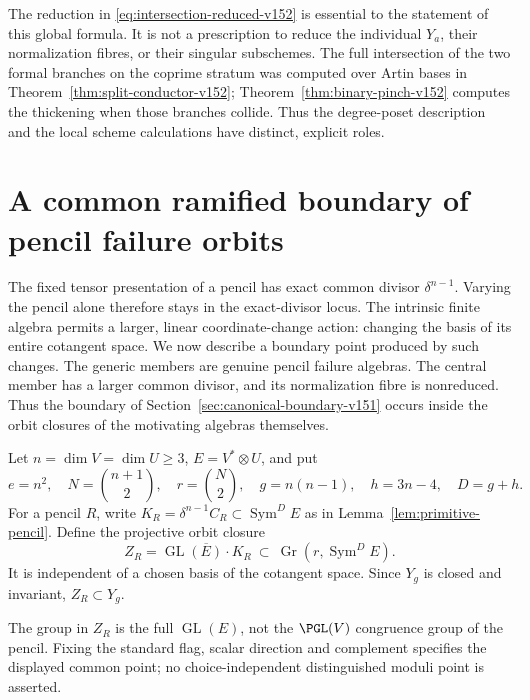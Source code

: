 \documentclass[11pt,reqno]{amsart}
\numberwithin{equation}{section}
\theoremstyle{definition}\newtheorem{definition}[theorem]{Definition}
\theoremstyle{remark}\newtheorem{remark}[theorem]{Remark}
\DeclareMathOperator{\Sym}{Sym}\DeclareMathOperator{\Gr}{Gr}
\begin{document}
The reduction in \eqref{eq:intersection-reduced-v152} is essential
to the statement of this global formula.  It is not a prescription
to reduce the individual $Y_a$, their normalization fibres, or their
singular subschemes.  The full intersection of the two formal
branches on the coprime stratum was computed over Artin bases in
Theorem~\ref{thm:split-conductor-v152};
Theorem~\ref{thm:binary-pinch-v152} computes the thickening when
those branches collide.  Thus the degree-poset description and
the local scheme calculations have distinct, explicit roles.


\section{A common ramified boundary of pencil failure orbits}
\label{sec:orbit-boundary-v152}

The fixed tensor presentation of a pencil has exact common divisor
$\delta^{n-1}$.  Varying the pencil alone therefore stays in the
exact-divisor locus.  The intrinsic finite algebra permits a larger,
linear coordinate-change action: changing the basis of its entire cotangent
space.  We now describe a boundary point produced by such changes.
The generic members are genuine pencil failure algebras.  The central
member has a larger common divisor, and its normalization fibre is
nonreduced.  Thus the boundary of Section~\ref{sec:canonical-boundary-v151}
occurs inside the orbit closures of the motivating algebras themselves.

Let $n=\dim V=\dim U\geq3$, $E=V^*\otimes U$, and put
\[
 e=n^2,\quad N=\binom{n+1}{2},\quad r=\binom N2,\quad
 g=n(n-1),\quad h=3n-4,\quad D=g+h.
\]
For a pencil $R$, write $K_R=\delta^{n-1}C_R\subset\Sym^D E$
as in Lemma~\ref{lem:primitive-pencil}.  Define the projective orbit
closure
\[
 Z_R=\overline{\operatorname{GL}(E)\cdot K_R}
                  \ \subset\ \Gr(r,\Sym^D E).
\]
It is independent of a chosen basis of the cotangent space.  Since
$Y_g$ is closed and invariant, $Z_R\subset Y_g$.

The group in $Z_R$ is the full $\operatorname{GL}(E)$, not the
$\PGL(V)$ congruence group of the pencil. Fixing the standard flag,
scalar direction and complement specifies the displayed common point;
no choice-independent distinguished moduli point is asserted.
\end{document}
